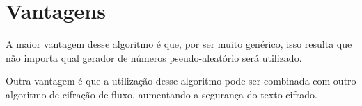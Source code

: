 \section{Vantagens}

A maior vantagem desse algoritmo é que, por ser muito genérico, isso resulta que não importa qual gerador de números pseudo-aleatório será utilizado. 

Outra vantagem é que a utilização desse algoritmo pode ser combinada com outro algoritmo de cifração de fluxo, aumentando a segurança do texto cifrado.